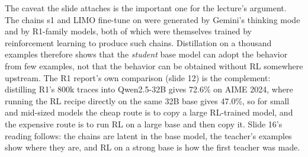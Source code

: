 \documentclass[11pt,letterpaper]{article}
\begin{document}
The caveat the slide attaches is the important one for the lecture's argument. The chains s1 and LIMO fine-tune on were generated by Gemini's thinking mode and by R1-family models, both of which were themselves trained by reinforcement learning to produce such chains. Distillation on a thousand examples therefore shows that the \emph{student} base model can adopt the behavior from few examples, not that the behavior can be obtained without RL somewhere upstream. The R1 report's own comparison (slide 12) is the complement: distilling R1's 800k traces into Qwen2.5-32B gives 72.6\% on AIME 2024, where running the RL recipe directly on the same 32B base gives 47.0\%, so for small and mid-sized models the cheap route is to copy a large RL-trained model, and the expensive route is to run RL on a large base and then copy it. Slide 16's reading follows: the chains are latent in the base model, the teacher's examples show where they are, and RL on a strong base is how the first teacher was made.
\end{document}
